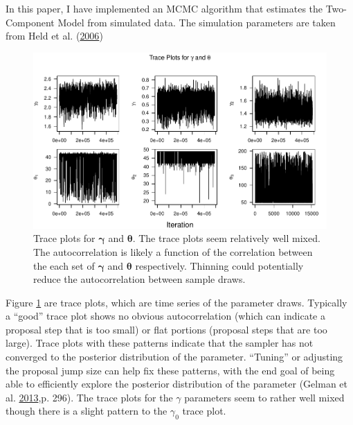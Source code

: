 \documentclass[11pt,a4paper]{article}
\numberwithin{equation}{section}
\begin{document}
\pagebreak

In this paper, I have implemented an MCMC algorithm that estimates the
Two-Component Model from simulated data. The simulation parameters are
taken from Held et al.
(\protect\hyperlink{ref-held_two-component_2006}{2006})

\begin{figure}
\centering
\includegraphics{thesis_draft_files/figure-latex/lambda_traces_plot-1.pdf}
\caption{\label{fig:lam_trace} Trace plots for \(\boldsymbol{\gamma}\)
and \(\boldsymbol{\theta}\). The trace plots seem relatively well mixed.
The autocorrelation is likely a function of the correlation between the
each set of \(\boldsymbol{\gamma}\) and \(\boldsymbol{\theta}\)
respectively. Thinning could potentially reduce the autocorrelation
between sample draws.}
\end{figure}

Figure \ref{fig:lam_trace} are trace plots, which are time series of the
parameter draws. Typically a ``good'' trace plot shows no obvious
autocorrelation (which can indicate a proposal step that is too small)
or flat portions (proposal steps that are too large). Trace plots with
these patterns indicate that the sampler has not converged to the
posterior distribution of the parameter. ``Tuning'' or adjusting the
proposal jump size can help fix these patterns, with the end goal of
being able to efficiently explore the posterior distribution of the
parameter (Gelman et al.
\protect\hyperlink{ref-gelman_bayesian_2013}{2013},p. 296). The trace
plots for the \(\gamma\) parameters seem to rather well mixed though
there is a slight pattern to the \(\gamma_0\) trace plot.
\end{document}
